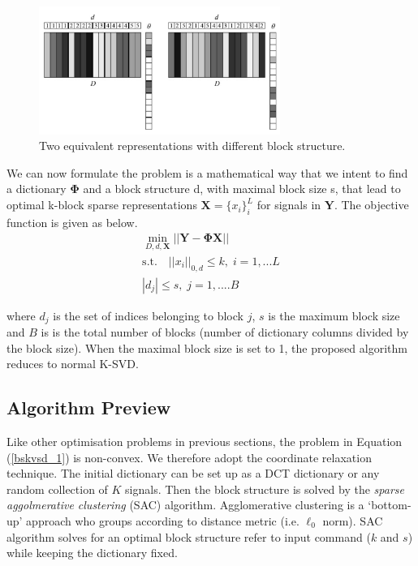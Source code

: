\begin{figure}[!htbp]
\centering
\includegraphics[width=0.7\textwidth]{images/block_dict_compare.png}
\caption{Two equivalent representations with different block structure.}
\label{block_dict_compare}
\end{figure}

We can now formulate the problem is a mathematical way that we intent to find a dictionary $\mathbf{\Phi}$ and a block structure d, with maximal block size s, that lead to optimal k-block sparse representations $\mathbf{X} = \{x_i\}^L_i $ for signals in $\mathbf{Y}$. The objective function is given as below.\\
\begin{equation}
\begin{aligned} 
    \min_{D,d,\mathbf{X}} ||\mathbf{Y} -\mathbf{\Phi}\mathbf{X}||\\
    \text{s.t.} \quad ||x_i||_{0,d} \leq k, \; i = 1,...L\\
    |d_j| \leq s, \; j = 1,....B
    \label{bskvsd_1}
\end{aligned}
\end{equation}

where $d_j$ is the set of indices belonging to block $j$, $s$ is the maximum block size and $B$ is
is the total number of blocks (number of dictionary columns divided by the block size). When the maximal block size is set to 1, the proposed algorithm reduces to normal K-SVD.\\


\subsection{Algorithm Preview}
Like other optimisation problems in previous sections, the problem in Equation (\ref{bskvsd_1}) is non-convex. We therefore adopt the coordinate relaxation technique. The initial dictionary can be set up as a DCT dictionary or any random collection of $K$ signals. Then the block structure is solved by the \textit{sparse aggolmerative clustering} (SAC) algorithm\cite{Johnson1967}. Agglomerative clustering is a `bottom-up' approach who groups according to distance metric (i.e. $\ell_0$ norm). SAC algorithm solves for an optimal block structure refer to input command ($k$ and $s$) while keeping the dictionary fixed.


